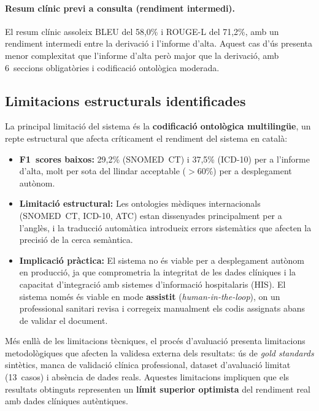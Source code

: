 \documentclass[CAT]{TFUOC}%
\begin{document}
\paragraph{Resum clínic previ a consulta (rendiment intermedi).}
El resum clínic assoleix BLEU del 58,0\% i ROUGE-L del 71,2\%, amb un rendiment intermedi entre la derivació i l'informe d'alta. Aquest cas d'ús presenta menor complexitat que l'informe d'alta però major que la derivació, amb 6~seccions obligatòries i codificació ontològica moderada.

\subsection{Limitacions estructurals identificades}

La principal limitació del sistema és la \textbf{codificació ontològica multilingüe}, un repte estructural que afecta críticament el rendiment del sistema en català:

\begin{itemize}
    \item \textbf{F1~scores baixos:} 29,2\% (SNOMED~CT) i 37,5\% (ICD-10) per a l'informe d'alta, molt per sota del llindar acceptable ($>$60\%) per a desplegament autònom.
    
    \item \textbf{Limitació estructural:} Les ontologies mèdiques internacionals (SNOMED~CT, ICD-10, ATC) estan dissenyades principalment per a l'anglès, i la traducció automàtica introdueix errors sistemàtics que afecten la precisió de la cerca semàntica.
    
    \item \textbf{Implicació pràctica:} El sistema no és viable per a desplegament autònom en producció, ja que comprometria la integritat de les dades clíniques i la capacitat d'integració amb sistemes d'informació hospitalaris (HIS). El sistema només és viable en mode \textbf{assistit} (\textit{human-in-the-loop}), on un professional sanitari revisa i corregeix manualment els codis assignats abans de validar el document.
\end{itemize}

Més enllà de les limitacions tècniques, el procés d'avaluació presenta limitacions metodològiques que afecten la validesa externa dels resultats: ús de \textit{gold standards} sintètics, manca de validació clínica professional, dataset d'avaluació limitat (13~casos) i absència de dades reals. Aquestes limitacions impliquen que els resultats obtinguts representen un \textbf{límit superior optimista} del rendiment real amb dades clíniques autèntiques.
\end{document}
